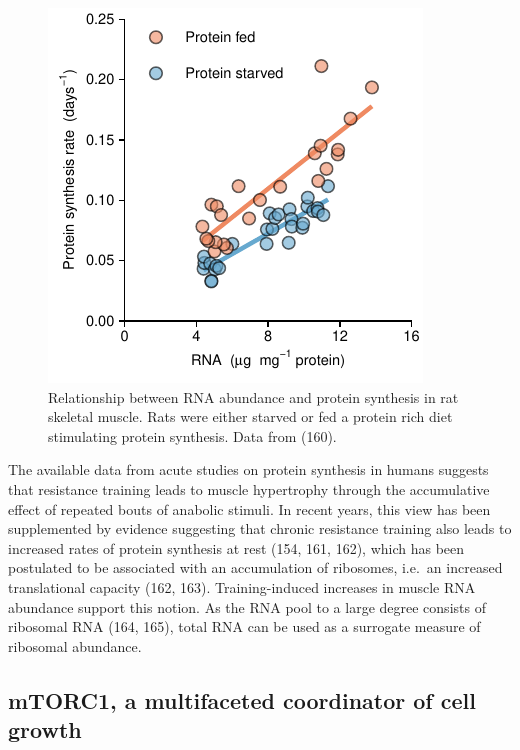 \documentclass[twoside,10pt]{gihclass} %
\begin{document}
\begin{figure}

{\centering \includegraphics{thesis_files/figure-latex/Millward1973-1} 

}

\caption[Relationship between RNA content and protein synthesis in rat skeletal muscle, data from (160)]{Relationship between RNA abundance and protein synthesis in rat skeletal muscle. Rats were either starved or fed a protein rich diet stimulating protein synthesis. Data from (160).}\label{fig:Millward1973}
\end{figure}
The available data from acute studies on protein synthesis in humans suggests that resistance training leads to muscle hypertrophy through the accumulative effect of repeated bouts of anabolic stimuli. In recent years, this view has been supplemented by evidence suggesting that chronic resistance training also leads to increased rates of protein synthesis at rest
(154, 161, 162),
which has been postulated to be associated with an accumulation of ribosomes, i.e.~an increased translational capacity
(162, 163).
Training-induced increases in muscle RNA abundance support this notion.
As the RNA pool to a large degree consists of ribosomal RNA
(164, 165),
total RNA can be used as a surrogate measure of ribosomal abundance.

\hypertarget{mtorc1-a-multifaceted-coordinator-of-cell-growth}{%
\subsection{mTORC1, a multifaceted coordinator of cell growth}\label{mtorc1-a-multifaceted-coordinator-of-cell-growth}}
\end{document}
